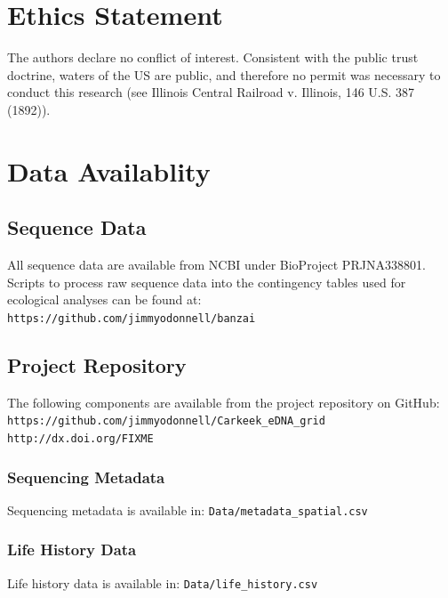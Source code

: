 \documentclass[11pt,letterpaper]{article} %
\begin{document}
\section*{Ethics Statement}
The authors declare no conflict of interest.
Consistent with the public trust doctrine, waters of the US are public, and therefore no permit was necessary to conduct this research (see Illinois Central Railroad v. Illinois, 146 U.S. 387 (1892)).

\section*{Data Availablity}
\label{data}

\subsection*{Sequence Data}
\label{sequence_data}
All sequence data are available from NCBI under BioProject PRJNA338801.\\
Scripts to process raw sequence data into the contingency tables used for ecological analyses can be found at: \\
\verb!https://github.com/jimmyodonnell/banzai!\\

\subsection*{Project Repository}
The following components are available from the project repository on GitHub: \\
\verb!https://github.com/jimmyodonnell/Carkeek_eDNA_grid!\\
\verb!http://dx.doi.org/FIXME!

\subsubsection*{Sequencing Metadata}
\label{sequencing_metadata}
Sequencing metadata is available in: \verb!Data/metadata_spatial.csv!

\subsubsection*{Life History Data}
\label{life_history_data}
Life history data is available in: \verb!Data/life_history.csv!
\end{document}
